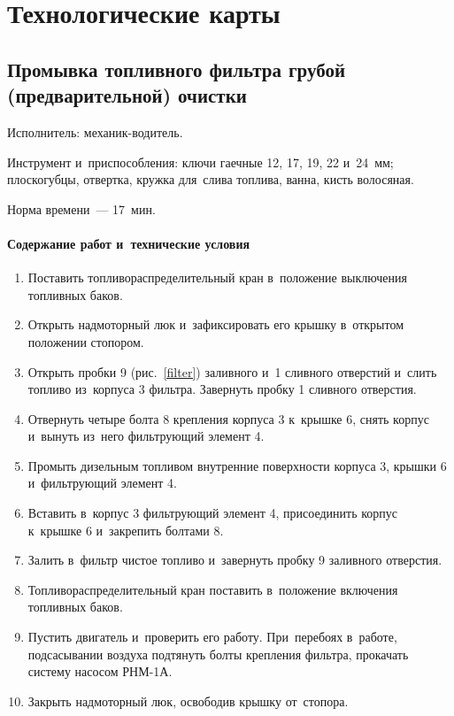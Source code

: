 \chapter{Технологические карты}


\newcommand{\techcardsection}[1]{
    \refstepcounter{techcard}
    \label{techcard\arabic{techcard}}
    \section{#1}
}

\newenvironment{itemizenosep}{\begin{itemize}[topsep=0pt, partopsep=0pt, itemsep=0pt, parsep=0pt]}{\end{itemize}}
\newenvironment{standarttime}{\noindent Норма времени: \begin{itemizenosep}}{\end{itemizenosep}}


\techcardsection{Промывка топливного фильтра грубой (предварительной) очистки}

\noindent
Исполнитель: механик-водитель. 

\noindent
Инструмент и~приспособления: ключи гаечные 12, 17, 19, 22 и~24~мм; плоскогубцы, отвертка, кружка для~слива топлива, ванна, кисть волосяная. 

\noindent
Норма времени~--- 17~мин.

\subsubsection{Содержание работ и~технические условия}
\begin{enumerate}
    \item Поставить топливораспределительный кран в~положение выключения топливных баков. 
    \item Открыть надмоторный люк и~зафиксировать его крышку в~открытом положении стопором. 
    \item Открыть пробки 9 (рис.~\ref{filter}) заливного и~1 сливного отверстий и~слить топливо из~корпуса 3 фильтра. Завернуть пробку 1 сливного отверстия. 
    \item Отвернуть четыре болта 8 крепления корпуса 3 к~крышке 6, снять корпус и~вынуть из~него фильтрующий элемент 4. 
    \item Промыть дизельным топливом внутренние поверхности корпуса 3, крышки 6 и~фильтрующий элемент 4. 
    \item Вставить в~корпус 3 фильтрующий элемент 4, присоединить корпус к~крышке 6 и~закрепить болтами 8. 
    \item Залить в~фильтр чистое топливо и~завернуть пробку 9 заливного отверстия. 
    \item Топливораспределительный кран поставить в~положение включения топливных баков. 
    \item Пустить двигатель и~проверить его работу. При~перебоях в~работе, подсасывании воздуха подтянуть болты крепления фильтра, прокачать систему насосом РНМ-1А. 
    \item Закрыть надмоторный люк, освободив крышку от~стопора.
\end{enumerate}

